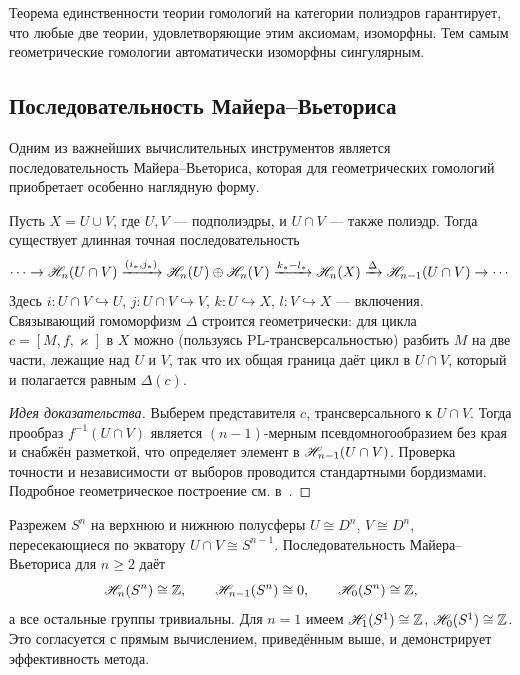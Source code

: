 \documentclass[12pt]{article}
\begin{document}
Теорема единственности теории гомологий на категории полиэдров гарантирует, что любые две теории, удовлетворяющие этим аксиомам, изоморфны. Тем самым геометрические гомологии автоматически изоморфны сингулярным.

\subsection{Последовательность Майера–Вьеториса}
Одним из важнейших вычислительных инструментов является последовательность Майера–Вьеториса, которая для геометрических гомологий приобретает особенно наглядную форму.

\begin{theorem}\label{thm:MV}
Пусть $X = U \cup V$, где $U,V$ — подполиэдры, и $U \cap V$ — также полиэдр. Тогда существует длинная точная последовательность
\[
\cdots \to \mathscr{H}_n(U \cap V) \xrightarrow{(i_*, j_*)} \mathscr{H}_n(U) \oplus \mathscr{H}_n(V) \xrightarrow{k_* - l_*} \mathscr{H}_n(X) \xrightarrow{\Delta} \mathscr{H}_{n-1}(U \cap V) \to \cdots
\]
Здесь $i: U\cap V \hookrightarrow U$, $j: U\cap V \hookrightarrow V$, $k: U \hookrightarrow X$, $l: V \hookrightarrow X$ — включения. Связывающий гомоморфизм $\Delta$ строится геометрически: для цикла $c = [M,f,\varkappa]$ в $X$ можно (пользуясь PL-трансверсальностью) разбить $M$ на две части, лежащие над $U$ и $V$, так что их общая граница даёт цикл в $U\cap V$, который и полагается равным $\Delta(c)$.
\end{theorem}
\begin{proof}[Идея доказательства]
Выберем представителя $c$, трансверсального к $U \cap V$. Тогда прообраз $f^{-1}(U \cap V)$ является $(n-1)$-мерным псевдомногообразием без края и снабжён разметкой, что определяет элемент в $\mathscr{H}_{n-1}(U \cap V)$. Проверка точности и независимости от выборов проводится стандартными бордизмами. Подробное геометрическое построение см. в~\cite{BRS}. %
\end{proof}

\begin{example}
Разрежем $S^n$ на верхнюю и нижнюю полусферы $U \cong D^n$, $V \cong D^n$, пересекающиеся по экватору $U \cap V \cong S^{n-1}$. Последовательность Майера–Вьеториса для $n\ge 2$ даёт
\[
\mathscr{H}_n(S^n) \cong \mathbb Z,\qquad \mathscr{H}_{n-1}(S^n) \cong 0,\qquad \mathscr{H}_0(S^n) \cong \mathbb Z,
\]
а все остальные группы тривиальны. Для $n=1$ имеем $\mathscr{H}_1(S^1)\cong \mathbb Z$, $\mathscr{H}_0(S^1)\cong \mathbb Z$. Это согласуется с прямым вычислением, приведённым выше, и демонстрирует эффективность метода.
\end{example}
\end{document}
